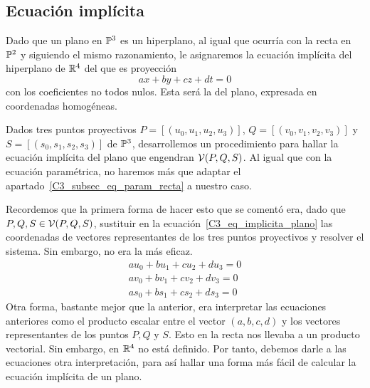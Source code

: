 \subsection{Ecuación implícita}

Dado que un plano en $\mathbb{P}^3$ es un hiperplano, al igual que ocurría con la recta en $\mathbb{P}^2$ y siguiendo el mismo razonamiento, le asignaremos la ecuación implícita del hiperplano de $\mathbb{R}^4$ del que es proyección
\begin{equation}
\label{C3_eq_implicita_plano}
ax+by+cz+dt=0
\end{equation}
con los coeficientes no todos nulos. Esta será la  del plano, expresada en coordenadas homogéneas. 

Dados tres puntos proyectivos $P=[(u_0,u_1,u_2,u_3)]$, $Q=[(v_0,v_1,v_2,v_3)]$ y $S=[(s_0,s_1,s_2,s_3)]$ de $\mathbb{P}^3$, desarrollemos un procedimiento para hallar la ecuación implícita del plano que engendran $\mathcal{V}(P,Q,S)$. Al igual que con la ecuación paramétrica, no haremos más que adaptar el apartado~\ref{C3_subsec_eq_param_recta} a nuestro caso.

Recordemos que la primera forma de hacer esto que se comentó era, dado que $P,Q,S\in \mathcal{V}(P,Q,S)$, sustituir en la ecuación~\eqref{C3_eq_implicita_plano} las coordenadas de vectores representantes de los tres puntos proyectivos y resolver el sistema. Sin embargo, no era la más eficaz.
\begin{equation}
	\begin{split}
		au_0+bu_1+cu_2+du_3=0\\
		av_0+bv_1+cv_2+dv_3=0\\
		as_0+bs_1+cs_2+ds_3=0
	\end{split}
\end{equation}
Otra forma, bastante mejor que la anterior, era interpretar las ecuaciones anteriores como el producto escalar entre el vector $(a,b,c,d)$ y los vectores representantes de los puntos $P,Q$ y $S$. Esto en la recta nos llevaba a un producto vectorial. Sin embargo, en $\mathbb{R}^4$ no está definido. Por tanto, debemos darle a las ecuaciones otra interpretación, para así hallar una forma más fácil de calcular la ecuación implícita de un plano. 

